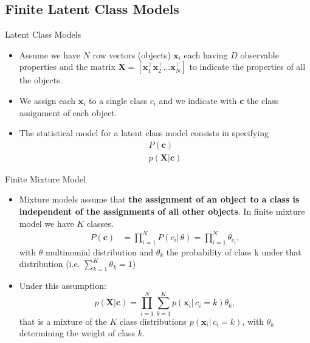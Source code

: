 \documentclass[aspectratio=169,xcolor=dvipsnames]{beamer}
\newcommand{\vecx}{\textbf{x}}
\newcommand{\vecc}{\textbf{c}}
\newcommand{\matx}{\textbf{X}}
\begin{document}
\subsection{Finite Latent Class Models} 
\begin{frame}{Latent Class Models}
\setlength{\leftmargini}{0.2cm}
\begin{itemize}[<+->]
\item Assume we have $N$ row vectors (objects) $\vecx_i$ each having $D$ observable properties and the matrix $\matx = [\vecx^{\top}_1 \vecx^{\top}_2 \dots \vecx^{\top}_N ]$ to indicate the properties of all the objects.
\item We assign each $\vecx_i$ to a single class $c_i$ and we indicate with $\vecc$ the class assignment of each object.
\item The statistical model for a latent class model consists in specifying 
\begin{gather*}
  P(\vecc) \\
  p(\matx|\vecc)   
\end{gather*}
\end{itemize}
\end{frame}
\begin{frame}{Finite Mixture Model}
\setlength{\leftmargini}{0.2cm}
\begin{itemize}[<+->]
\item Mixture models assume that \textbf{the assignment of an object to a class is independent of the assignments of all other objects}. In finite mixture model we have $K$ classes.
\begin{align*}
    P(\vecc) &= \prod_{i=1}^{N} P(c_i| \, \theta) =  \prod_{i=1}^{N} \theta_{c_i},
\end{align*}
with $\theta$ multinomial distribution and $\theta_k$ the probability of class k under that distribution (i.e. $\sum_{k=1}^{K} \theta_k=1$)
\item Under this assumption:
\begin{equation*}
      p(\matx|\vecc) = \prod_{i=1}^{N} \sum_{k=1}^{K} p(\vecx_i| \, c_i=k)\theta_k,
\end{equation*}
that is a mixture of the $K$ class distributions $p(\vecx_i| \, c_i = k)$, with $\theta_k$ determining the weight of class $k$.
\end{itemize}
\end{frame}
\end{document}
